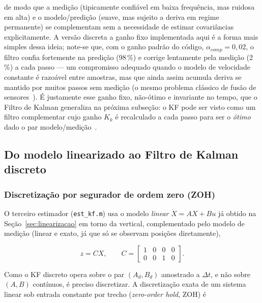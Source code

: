 \documentclass[brazil, 12pt]{article}
\begin{document}
de modo que a medição (tipicamente confiável em baixa frequência, mas ruidosa
em alta) e o modelo/predição (suave, mas sujeito a deriva em regime
permanente) se complementam sem a necessidade de estimar covariâncias
explicitamente. A versão discreta a ganho fixo implementada aqui é a forma mais
simples dessa ideia; note-se que, com o ganho padrão do código,
$\alpha_{comp} = 0{,}02$, o filtro confia fortemente na predição (98\,\%) e
corrige lentamente pela medição (2\,\%) a cada passo — um compromisso adequado
quando o modelo de velocidade constante é razoável entre amostras, mas que
ainda assim acumula deriva se mantido por muitos passos sem medição (o mesmo
problema clássico de fusão de sensores~\cite{simon2006}). É justamente esse
ganho fixo, não-ótimo e invariante no tempo, que o Filtro de Kalman generaliza
na próxima subseção: o KF pode ser visto como um filtro complementar cujo
ganho $K_k$ é recalculado a cada passo para ser o \emph{ótimo} dado o par
modelo/medição~\cite{simon2006}.

\subsection{Do modelo linearizado ao Filtro de Kalman discreto}
\label{sec:kf-linear}

\subsubsection{Discretização por segurador de ordem zero (ZOH)}
\label{sec:zoh}

O terceiro estimador (\texttt{est\_kf.m}) usa o modelo \emph{linear}
$\dot X = AX+Bu$ já obtido na Seção~\ref{sec:linearizacao} em torno da vertical,
complementado pelo modelo de medição (linear e exato, já que só se observam
posições diretamente),

\[
z = C X, \qquad
C = \begin{bmatrix} 1 & 0 & 0 & 0 \\ 0 & 0 & 1 & 0 \end{bmatrix}.
\]

Como o KF discreto opera sobre o par $(A_d, B_d)$ amostrado a $\Delta t$, e não
sobre $(A,B)$ contínuos, é preciso discretizar. A discretização exata de um
sistema linear sob entrada constante por trecho (\emph{zero-order hold}, ZOH) é
\end{document}
